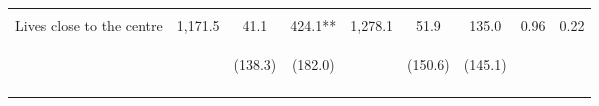 \begin{tabular}{lcccccccc}
 & \begin{footnotesize}\end{footnotesize} & \begin{footnotesize}[1.000]\end{footnotesize} & \begin{footnotesize}[0.027]\end{footnotesize} & \begin{footnotesize}\end{footnotesize} & \begin{footnotesize}[1.000]\end{footnotesize} & \begin{footnotesize}[0.527]\end{footnotesize} & \begin{footnotesize}\end{footnotesize} & \begin{footnotesize}\end{footnotesize}\\
\noalign{\smallskip}Lives close to the centre & 1,171.5 & 41.1 & 424.1** & 1,278.1 & 51.9 & 135.0 & 0.96 & 0.22\\
 & \begin{footnotesize}\end{footnotesize} & \begin{footnotesize}(138.3)\end{footnotesize} & \begin{footnotesize}(182.0)\end{footnotesize} & \begin{footnotesize}\end{footnotesize} & \begin{footnotesize}(150.6)\end{footnotesize} & \begin{footnotesize}(145.1)\end{footnotesize} & \begin{footnotesize}\end{footnotesize} & \begin{footnotesize}\end{footnotesize}\\
 & \begin{footnotesize}\end{footnotesize} & \begin{footnotesize}[1.000]\end{footnotesize} & \begin{footnotesize}[0.036]\end{footnotesize} & \begin{footnotesize}\end{footnotesize} & \begin{footnotesize}[1.000]\end{footnotesize} & \begin{footnotesize}[0.527]\end{footnotesize} & \begin{footnotesize}\end{footnotesize} & \begin{footnotesize}\end{footnotesize}\\

\end{tabular}
